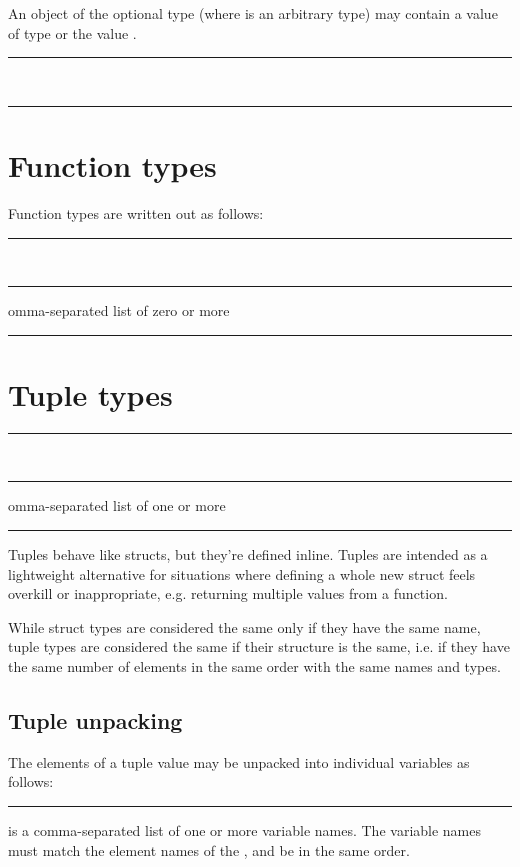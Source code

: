 An object of the optional type  (where  is an arbitrary type)
may contain a value of type  or the value .

\begin{grammar}
\rule{optional-type}  \\
\rule{wrapped-type} 
\end{grammar}

\section{Function types}

Function types are written out as follows:

\begin{grammar}
\rule{function-type} \code{(}  \code{)} \code{->} \\
\rule{parameter-type-list} comma-separated list of zero or more \\
\rule{return-type} 
\end{grammar}

\section{Tuple types}

\begin{grammar}
\rule{tuple-type} \code{(}  \code{)}\\
\rule{tuple-element-list} comma-separated list of one or more \\
\rule{tuple-element}  
\end{grammar}

Tuples behave like structs, but they're defined inline. Tuples are intended as
a lightweight alternative for situations where defining a whole new struct feels
overkill or inappropriate, e.g. returning multiple values from a function.

While struct types are considered the same only if they have the same name,
tuple types are considered the same if their structure is the same, i.e. if they
have the same number of elements in the same order with the same names and
types.

\subsection{Tuple unpacking}

The elements of a tuple value may be unpacked into individual variables as
follows:

\begin{grammar}
\rule{tuple-unpack-statement}  \code{=}  \code{;}
\end{grammar}

 is a comma-separated list of one or more variable
names. The variable names must match the element names of the
, and be in the same order.
